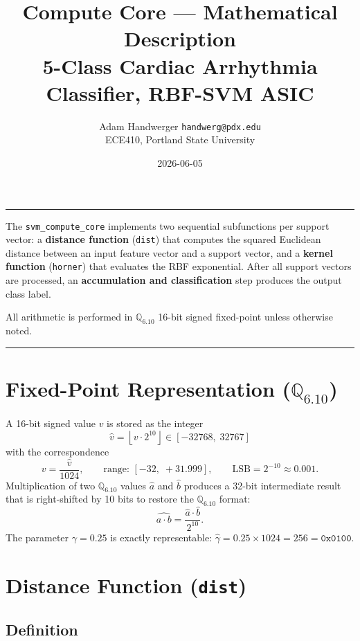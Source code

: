 \documentclass[11pt]{article}
\title{\textbf{Compute Core --- Mathematical Description}\\[0.4em]
       \large 5-Class Cardiac Arrhythmia Classifier, RBF-SVM ASIC}
\author{Adam Handwerger \quad \texttt{handwerg@pdx.edu}\\
        ECE410, Portland State University}
\date{2026-06-05}
\begin{document}
\maketitle
\noindent\rule{\linewidth}{0.5pt}

\vspace{0.3em}
The \texttt{svm\_compute\_core} implements two sequential subfunctions per support
vector: a \textbf{distance function} (\texttt{dist}) that computes the squared
Euclidean distance between an input feature vector and a support vector, and a
\textbf{kernel function} (\texttt{horner}) that evaluates the RBF exponential.
After all support vectors are processed, an \textbf{accumulation and classification}
step produces the output class label.

All arithmetic is performed in \(\mathbb{Q}_{6.10}\) 16-bit signed fixed-point
unless otherwise noted.

\vspace{0.5em}
\noindent\rule{\linewidth}{0.3pt}

\section{Fixed-Point Representation (\(\mathbb{Q}_{6.10}\))}

A 16-bit signed value \(v\) is stored as the integer
\[
    \hat{v} = \left\lfloor v \cdot 2^{10} \right\rfloor \in [-32768,\; 32767]
\]
with the correspondence
\[
    v = \frac{\hat{v}}{1024}, \qquad
    \text{range: } [-32,\; +31.999], \qquad
    \text{LSB} = 2^{-10} \approx 0.001.
\]
Multiplication of two \(\mathbb{Q}_{6.10}\) values \(\hat{a}\) and \(\hat{b}\)
produces a 32-bit intermediate result that is right-shifted by 10 bits to
restore the \(\mathbb{Q}_{6.10}\) format:
\[
    \widehat{a \cdot b} = \frac{\hat{a} \cdot \hat{b}}{2^{10}}.
\]
The parameter \(\gamma = 0.25\) is exactly representable:
\(\hat{\gamma} = 0.25 \times 1024 = 256 = \texttt{0x0100}\).

\section{Distance Function (\texttt{dist})}

\subsection{Definition}
\end{document}
